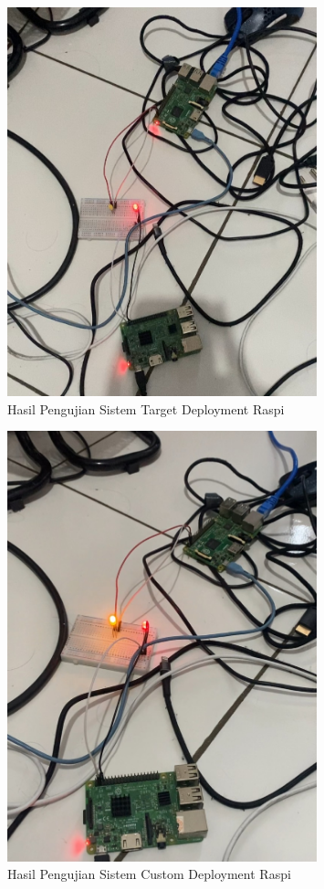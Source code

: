 \begin{figure}[ht]
  \centering
  \includegraphics[width=0.8\textwidth]{resources/chapter-4/pengujian/pengujian-sistem-raspi-hasil-a.jpg}
  \caption{Hasil Pengujian Sistem Target Deployment Raspi}
  \label{fig:hasil-pengujian-sistem-raspi-target}
\end{figure}

\begin{figure}[ht]
  \centering
  \includegraphics[width=0.8\textwidth]{resources/chapter-4/pengujian/pengujian-sistem-raspi-hasil-b.jpg}
  \caption{Hasil Pengujian Sistem Custom Deployment Raspi}
  \label{fig:hasil-pengujian-sistem-raspi-custom}
\end{figure}


